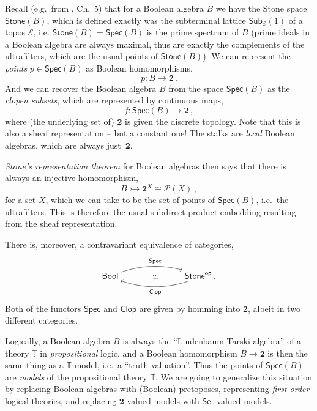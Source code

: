 \documentclass[12pt]{article}
\newcommand{\T}{\ensuremath{\mathbb{T}}}
\newcommand{\E}{\ensuremath{\mathcal{E}}}
\newcommand{\mono}{\ensuremath{\rightarrowtail}}
\theoremstyle{remark}
\theoremstyle{definition}
\begin{document}
Recall (e.g.\ from \cite{J}, Ch.~5) that for a Boolean algebra $B$ we have the Stone space $\mathsf{Stone}(B)$, which is defined exactly was the subterminal lattice $\mathsf{Sub}_{\E}(1)$ of a topos $\E$, i.e. $\mathsf{Stone}(B)=\mathsf{Spec}(B)$ is the prime spectrum of $B$ (prime ideals in a Boolean algebra are always maximal, thus are exactly the complements of the ultrafilters, which are the usual points of $\mathsf{Stone}(B)$).  We can represent the \emph{points} $p\in \mathsf{Spec}(B)$ as Boolean homomorphisms,
\[
p : B\to \mathbf{2}\,.
\]
And we can recover the Boolean algebra $B$ from the space $\mathsf{Spec}(B)$ as the \emph{clopen subsets}, which are represented by continuous maps,
\[
f : \mathsf{Spec}(B)\to \mathbf{2}\,,
\]
where (the underlying set of) $\mathbf{2}$ is given the discrete topology. Note that this is also a sheaf representation -- but a constant one!  The stalks are  \emph{local} Boolean algebras, which are always just~$\mathbf{2}$.  

\emph{Stone's representation theorem} for Boolean algebras then says that there is always an injective homomorphism,
\[
B \mono \mathbf{2}^X \cong \mathcal{P}(X)\,,
\]
for a set $X$, which we can take to be the set of points of $\mathsf{Spec}(B)$, i.e.\ the ultrafilters.  This is therefore the usual subdirect-product embedding resulting from the sheaf representation.

There is, moreover, a contravariant equivalence of categories,
\[
\xymatrix{ 
\mathsf{Bool}  \ar@/{}^{1pc}/[rr]^{\mathsf{Spec}}     & \quad\simeq &  \mathsf{Stone}^{\mathsf{op}}  \ar@/{}^{1pc}/[ll]^{\mathsf{Clop}} \,. \\
} 
\]
Both of the functors $\mathsf{Spec}$ and $\mathsf{Clop}$ are given by homming into $\mathbf{2}$, albeit in two different categories.

Logically, a Boolean algebra $B$  is always the ``Lindenbaum-Tarski algebra'' of a theory $\mathbb{T}$ in \emph{propositional} logic, and a Boolean homomorphism $B\to \mathbf{2}$ is then the same thing as a $\T$-model, i.e.\ a ``truth-valuation''.  Thus the points of $\mathsf{Spec}(B)$ are \emph{models} of the propositional theory $\mathbb{T}$.
We are going to generalize this situation by replacing Boolean algebras with (Boolean) pretoposes, representing \emph{first-order} logical theories, and replacing $\mathbf{2}$-valued models with $\mathsf{Set}$-valued models.
\end{document}
